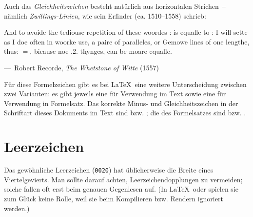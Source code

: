 Auch das \emph{Gleichheitszeichen} \Char{$=$} besteht natürlich aus horizontalen
Strichen~-- nämlich \emph{Zwillings-Linien}, wie sein Erfinder
 (ca. 1510--1558) schrieb:
\begin{displayquote}
  \foreignlanguage{british}{And to avoide the tediouse repetition of
    these woordes : is equalle to : I will sette as I doe often in
    woorke use, a paire of paralleles, or Gemowe lines of one lengthe,
    thus: $=$, bicause noe .2. thynges, can be moare equalle.}

  \quad---~Robert Recorde, \emph{The Whetstone of Witte} (1557)
\end{displayquote}

Für diese Formelzeichen gibt es bei \LaTeX\ eine weitere
Unterscheidung zwischen zwei Varianten: es gibt jeweils eine für
Verwendung im Text sowie eine für Verwendung in Formelsatz.  Das
korrekte Minus- und Gleichheitszeichen in der Schriftart dieses
Dokuments im Text sind \Char{\textminus} bzw. \Char{=}; die des
Formelsatzes sind \Char{$-$} bzw. \Char{$=$}.




\section{Leerzeichen}

Das gewöhnliche Leerzeichen (\texttt{0020}) hat üblicherweise die Breite eines
Viertelgevierts. Man sollte darauf achten, Leerzeichendopplungen zu vermeiden;
solche fallen oft erst beim genauen Gegenlesen auf. (In \LaTeX\ oder 
spielen sie zum Glück keine Rolle, weil sie beim Kompilieren bzw. Rendern
ignoriert werden.)

